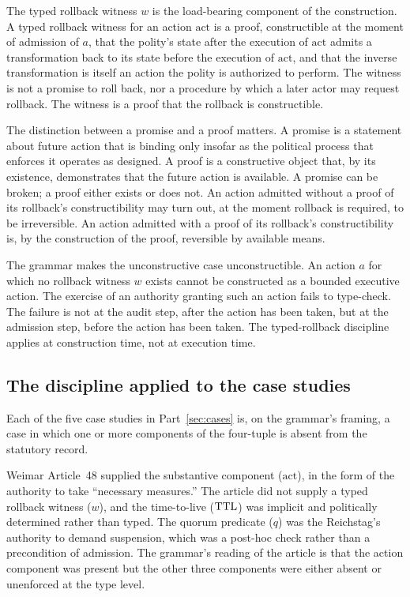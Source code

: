 The typed rollback witness $w$ is the load-bearing component of the construction.
A typed rollback witness for an action $\text{act}$ is a proof, constructible at the moment of admission of $a$,
that the polity's state after the execution of $\text{act}$ admits a transformation back to its state before
the execution of $\text{act}$,
and that the inverse transformation is itself an action the polity is authorized to perform.
The witness is not a promise to roll back, nor a procedure by which a later actor may request rollback.
The witness is a proof that the rollback is constructible.

The distinction between a promise and a proof matters.
A promise is a statement about future action that is binding only insofar as the political process
that enforces it operates as designed.
A proof is a constructive object that, by its existence, demonstrates that the future action is available.
A promise can be broken; a proof either exists or does not.
An action admitted without a proof of its rollback's constructibility may turn out, at the moment rollback is required,
to be irreversible.
An action admitted with a proof of its rollback's constructibility is, by the construction of the proof,
reversible by available means.

The grammar makes the unconstructive case unconstructible.
An action $a$ for which no rollback witness $w$ exists cannot be constructed as a bounded executive action.
The exercise of an authority granting such an action fails to type-check.
The failure is not at the audit step, after the action has been taken,
but at the admission step, before the action has been taken.
The typed-rollback discipline applies at construction time, not at execution time.

\subsection{The discipline applied to the case studies}

Each of the five case studies in Part~\ref{sec:cases} is, on the grammar's framing,
a case in which one or more components of the four-tuple is absent from the statutory record.

Weimar Article~48 supplied the substantive component ($\text{act}$), in the form of the authority to take
``necessary measures.'' The article did not supply a typed rollback witness ($w$),
and the time-to-live ($\mathrm{TTL}$) was implicit and politically determined rather than typed.
The quorum predicate ($q$) was the Reichstag's authority to demand suspension,
which was a post-hoc check rather than a precondition of admission.
The grammar's reading of the article is that the action component was present but the other three components
were either absent or unenforced at the type level.

